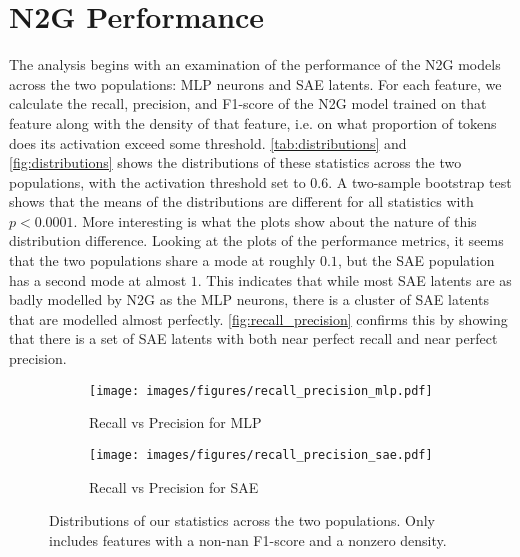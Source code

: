 \section{N2G Performance}
The analysis begins with an examination of the performance of the \ac{N2G} models across the two populations: \ac{MLP} neurons and \ac{SAE} latents.
For each feature, we calculate the recall, precision, and F1-score of the \ac{N2G} model trained on that feature along with the density of that feature, i.e. on what proportion of tokens does its activation exceed some threshold.
\autoref{tab:distributions} and \autoref{fig:distributions} shows the distributions of these statistics across the two populations, with the activation threshold set to $0.6$.
A two-sample bootstrap test shows that the means of the distributions are different for all statistics with $p<0.0001$.
More interesting is what the plots show about the nature of this distribution difference.
Looking at the plots of the performance metrics, it seems that the two populations share a mode at roughly $0.1$, but the \ac{SAE} population has a second mode at almost $1$.
This indicates that while most \ac{SAE} latents are as badly modelled by \ac{N2G} as the \ac{MLP} neurons, there is a cluster of \ac{SAE} latents that are modelled almost perfectly.
\autoref{fig:recall_precision} confirms this by showing that there is a set of \ac{SAE} latents with both near perfect recall and near perfect precision.

\begin{figure}[ht]
    \centering
    
    \begin{subfigure}[b]{0.45\textwidth}
        \centering
        \texttt{[image: images/figures/recall\_precision\_mlp.pdf]}
        \caption{Recall vs Precision for \ac{MLP}}
        \label{fig:recall_precision_mlp}
    \end{subfigure}
    \begin{subfigure}[b]{0.45\textwidth}
        \centering
        \texttt{[image: images/figures/recall\_precision\_sae.pdf]}
        \caption{Recall vs Precision for SAE}
        \label{fig:recall_precision_sae}
    \end{subfigure}
    
    \caption{Distributions of our statistics across the two populations. Only includes features with a non-nan F1-score and a nonzero density.}
    \label{fig:recall_precision}
\end{figure}

